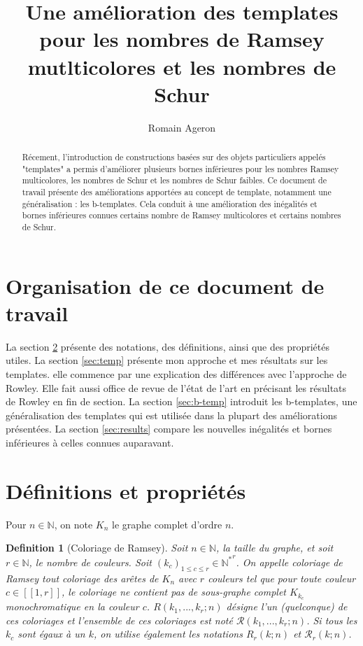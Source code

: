 \documentclass{article}
\title{Une amélioration des templates pour les nombres de Ramsey mutlticolores et les nombres de Schur}
\author{Romain Ageron}
\newtheorem{definition}{Definition}[section]
\begin{document}
\maketitle

\begin{abstract}
Récement, l'introduction de constructions basées sur des objets particuliers appelés "templates" a permis d'améliorer plusieurs bornes inférieures pour les nombres Ramsey multicolores, les nombres de Schur et les nombres de Schur faibles. Ce document de travail présente des améliorations apportées au concept de template, notamment une généralisation : les b-templates. Cela conduit à une amélioration des inégalités et bornes inférieures connues certains nombre de Ramsey multicolores et certains nombres de Schur.
\end{abstract}

\section{Organisation de ce document de travail}
La section \ref{sec:def} présente des notations, des définitions, ainsi que des propriétés utiles. La section \ref{sec:temp} présente mon approche et mes résultats sur les templates. elle commence par une explication des différences avec l'approche de Rowley. Elle fait aussi office de revue de l'état de l'art en précisant les résultats de Rowley en fin de section. La section \ref{sec:b-temp} introduit les b-templates, une généralisation des templates qui est utilisée dans la plupart des améliorations présentées. La section \ref{sec:results} compare les nouvelles inégalités et bornes inférieures à celles connues auparavant.

\section{Définitions et propriétés}
\label{sec:def}

Pour \(n \in \mathbb{N}\), on note \(K_n\) le graphe complet d'ordre \(n\).

\begin{definition}[Coloriage de Ramsey]
Soit \(n \in \mathbb{N}\), la taille du graphe, et soit \(r \in \mathbb{N}\), le nombre de couleurs. Soit \((k_c)_{1 \leqslant c \leqslant r} \in {\mathbb{N}^*}^r\). On appelle coloriage de Ramsey tout coloriage des arêtes de \(K_n\) avec \(r\) couleurs tel que pour toute couleur \(c \in [\![1, r]\!]\), le coloriage ne contient pas de sous-graphe complet \(K_{k_c}\) monochromatique en la couleur \(c\). \(R(k_1, ..., k_r ; n)\) désigne l'un (quelconque) de ces coloriages et l'ensemble de ces coloriages est noté \(\mathcal{R}(k_1, ..., k_r ; n)\). Si tous les \(k_c\) sont égaux à un \(k\), on utilise également les notations \(R_r(k; n)\) et \(\mathcal{R}_r(k; n)\).
\end{definition}
\end{document}

